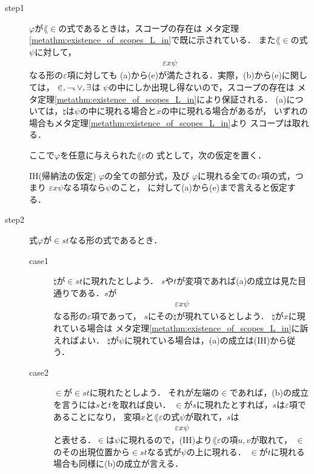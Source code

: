 	\begin{metaprf}\mbox{}
		\begin{description}
			\item[step1]
				$\varphi$が$\lang{\in}$の式であるときは，スコープの存在は
				メタ定理\ref{metathm:existence_of_scopes_L_in}で既に示されている．
				また$\lang{\in}$の式$\psi$に対して，
				\begin{align}
					\varepsilon x \psi
				\end{align}
				なる形の$\varepsilon$項に対しても
				(a)から(e)が満たされる．実際，(b)から(e)に関しては，
				$\in,\rightharpoondown\hspace{-0.25em},\vee,\exists$は
				$\psi$の中にしか出現し得ないので，スコープの存在は
				メタ定理\ref{metathm:existence_of_scopes_L_in}により保証される．
				(a)については，$\natural$は$\psi$の中に現れる場合と$x$の中に現れる場合があるが，
				いずれの場合もメタ定理\ref{metathm:existence_of_scopes_L_in}より
				スコープは取れる．
			
				ここで$\varphi$を任意に与えられた$\lang{\varepsilon}$の
				式として，次の仮定を置く．
				\begin{itembox}[l]{IH(帰納法の仮定)}
					$\varphi$の全ての部分式，及び
					$\varphi$に現れる全ての$\varepsilon$項の式，つまり
					$\varepsilon x \psi$なる項なら$\psi$のこと，
					に対して(a)から(e)まで言えると仮定する．
				\end{itembox}
				
			\item[step2]
				式$\varphi$が$\in s t$なる形の式であるとき．
				\begin{description}
					\item[case1]
						$\natural$が$\in s t$に現れたとしよう．
						$s$や$t$が変項であれば(a)の成立は見た目通りである．$s$が
						\begin{align}
							\varepsilon x \psi
						\end{align}
						なる形の$\varepsilon$項であって，
						$s$にその$\natural$が現れているとしよう．
						$\natural$が$x$に現れている場合は
						メタ定理\ref{metathm:existence_of_scopes_L_in}に訴えればよい．
						$\natural$が$\psi$に現れている場合は，(a)の成立は(IH)から従う．
						
					\item[case2]
						$\in$が$\in s t$に現れたとしよう．
						それが左端の$\in$であれば，(b)の成立を言うには$s$と$t$を取れば良い．
						$\in$が$s$に現れたとすれば，$s$は$\varepsilon$項であることになり，
						変項$x$と$\lang{\varepsilon}$の式$\psi$が取れて，$s$は
						\begin{align}
							\varepsilon x \psi
						\end{align}
						と表せる．$\in$は$\psi$に現れるので，(IH)より$\lang{\varepsilon}$の項$u,v$が取れて，
						$\in$のその出現位置から$\in s t$なる式が$\psi$の上に現れる．
						$\in$が$t$に現れる場合も同様に(b)の成立が言える．
				

\end{description}
\end{description}
\end{metaprf}
